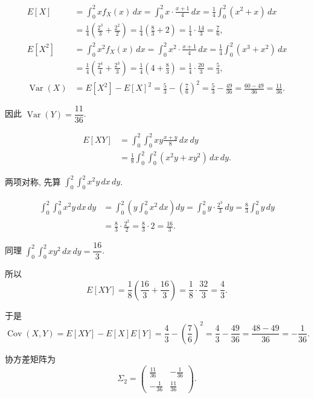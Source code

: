 \documentclass[../main.tex]{subfiles}
\begin{document}
\begin{solution}
\begin{enumerate}
\[
\begin{aligned}
E[X]
&=\int_0^2 x f_X(x)\,dx
=\int_0^2 x\cdot\frac{x+1}{4}\,dx
=\frac14\int_0^2 (x^2+x)\,dx\\
&=\frac14\left(\frac{2^3}{3}+\frac{2^2}{2}\right)
=\frac14\left(\frac83+2\right)
=\frac14\cdot\frac{14}{3}
=\frac76,\\[4pt]
E[X^2]
&=\int_0^2 x^2 f_X(x)\,dx
=\int_0^2 x^2\cdot\frac{x+1}{4}\,dx
=\frac14\int_0^2 (x^3+x^2)\,dx\\
&=\frac14\left(\frac{2^4}{4}+\frac{2^3}{3}\right)
=\frac14\left(4+\frac83\right)
=\frac14\cdot\frac{20}{3}
=\frac53,\\[4pt]
\operatorname{Var}(X)
&=E[X^2]-E[X]^2
=\frac53-\left(\frac76\right)^2
=\frac53-\frac{49}{36}
=\frac{60-49}{36}
=\frac{11}{36}.
\end{aligned}
\]

因此 \(\operatorname{Var}(Y)=\dfrac{11}{36}\).

\[
\begin{aligned}
E[XY]
&=\int_0^2\int_0^2 xy\frac{x+y}{8}\,dx\,dy\\
&=\frac18\int_0^2\int_0^2 (x^2y+xy^2)\,dx\,dy.
\end{aligned}
\]

两项对称, 先算 \(\int_0^2\int_0^2 x^2y\,dx\,dy\).

\[
\begin{aligned}
\int_0^2\int_0^2 x^2y\,dx\,dy
&=\int_0^2\left(y\int_0^2 x^2\,dx\right)dy
=\int_0^2 y\cdot\frac{2^3}{3}\,dy
=\frac83\int_0^2 y\,dy\\
&=\frac83\cdot\frac{2^2}{2}
=\frac83\cdot 2
=\frac{16}{3}.
\end{aligned}
\]

同理 \(\int_0^2\int_0^2 xy^2\,dx\,dy=\dfrac{16}{3}\).

所以
\[
E[XY]
=\frac18\left(\frac{16}{3}+\frac{16}{3}\right)
=\frac18\cdot\frac{32}{3}
=\frac43.
\]

于是
\[
\operatorname{Cov}(X,Y)
=E[XY]-E[X]E[Y]
=\frac43-\left(\frac76\right)^2
=\frac43-\frac{49}{36}
=\frac{48-49}{36}
=-\frac1{36}.
\]

协方差矩阵为
\[
\Sigma_2=
\begin{pmatrix}
\frac{11}{36} & -\frac1{36}\\[4pt]
-\frac1{36} & \frac{11}{36}
\end{pmatrix}.
\]


  \end{enumerate}
  
\end{solution}
\end{document}
